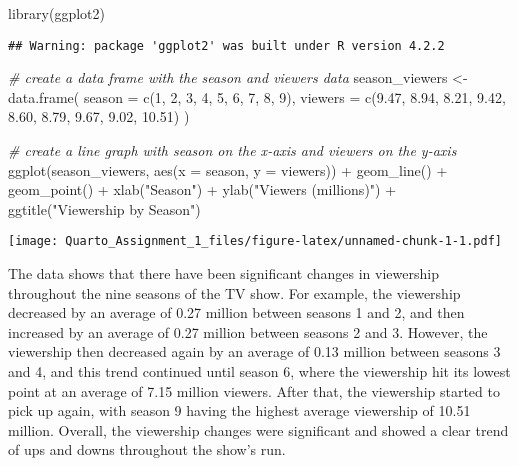 \documentclass[
]{article}
\newenvironment{Shaded}{\begin{snugshade}}{\end{snugshade}}
\newcommand{\AttributeTok}[1]{\textcolor[rgb]{0.77,0.63,0.00}{#1}}
\newcommand{\CommentTok}[1]{\textcolor[rgb]{0.56,0.35,0.01}{\textit{#1}}}
\newcommand{\DecValTok}[1]{\textcolor[rgb]{0.00,0.00,0.81}{#1}}
\newcommand{\FloatTok}[1]{\textcolor[rgb]{0.00,0.00,0.81}{#1}}
\newcommand{\FunctionTok}[1]{\textcolor[rgb]{0.00,0.00,0.00}{#1}}
\newcommand{\NormalTok}[1]{#1}
\newcommand{\OtherTok}[1]{\textcolor[rgb]{0.56,0.35,0.01}{#1}}
\newcommand{\SpecialCharTok}[1]{\textcolor[rgb]{0.00,0.00,0.00}{#1}}
\newcommand{\StringTok}[1]{\textcolor[rgb]{0.31,0.60,0.02}{#1}}
\begin{document}
\begin{Shaded}
\begin{Highlighting}[]
\FunctionTok{library}\NormalTok{(ggplot2)}
\end{Highlighting}
\end{Shaded}

\begin{verbatim}
## Warning: package 'ggplot2' was built under R version 4.2.2
\end{verbatim}

\begin{Shaded}
\begin{Highlighting}[]
\CommentTok{\# create a data frame with the season and viewers data}
\NormalTok{season\_viewers }\OtherTok{\textless{}{-}} \FunctionTok{data.frame}\NormalTok{(}
  \AttributeTok{season =} \FunctionTok{c}\NormalTok{(}\DecValTok{1}\NormalTok{, }\DecValTok{2}\NormalTok{, }\DecValTok{3}\NormalTok{, }\DecValTok{4}\NormalTok{, }\DecValTok{5}\NormalTok{, }\DecValTok{6}\NormalTok{, }\DecValTok{7}\NormalTok{, }\DecValTok{8}\NormalTok{, }\DecValTok{9}\NormalTok{),}
  \AttributeTok{viewers =} \FunctionTok{c}\NormalTok{(}\FloatTok{9.47}\NormalTok{, }\FloatTok{8.94}\NormalTok{, }\FloatTok{8.21}\NormalTok{, }\FloatTok{9.42}\NormalTok{, }\FloatTok{8.60}\NormalTok{, }\FloatTok{8.79}\NormalTok{, }\FloatTok{9.67}\NormalTok{, }\FloatTok{9.02}\NormalTok{, }\FloatTok{10.51}\NormalTok{)}
\NormalTok{)}

\CommentTok{\# create a line graph with season on the x{-}axis and viewers on the y{-}axis}
\FunctionTok{ggplot}\NormalTok{(season\_viewers, }\FunctionTok{aes}\NormalTok{(}\AttributeTok{x =}\NormalTok{ season, }\AttributeTok{y =}\NormalTok{ viewers)) }\SpecialCharTok{+}
  \FunctionTok{geom\_line}\NormalTok{() }\SpecialCharTok{+}
  \FunctionTok{geom\_point}\NormalTok{() }\SpecialCharTok{+}
  \FunctionTok{xlab}\NormalTok{(}\StringTok{"Season"}\NormalTok{) }\SpecialCharTok{+}
  \FunctionTok{ylab}\NormalTok{(}\StringTok{"Viewers (millions)"}\NormalTok{) }\SpecialCharTok{+}
  \FunctionTok{ggtitle}\NormalTok{(}\StringTok{"Viewership by Season"}\NormalTok{)}
\end{Highlighting}
\end{Shaded}

\texttt{[image: Quarto\_Assignment\_1\_files/figure-latex/unnamed-chunk-1-1.pdf]}

The data shows that there have been significant changes in viewership
throughout the nine seasons of the TV show. For example, the viewership
decreased by an average of 0.27 million between seasons 1 and 2, and
then increased by an average of 0.27 million between seasons 2 and 3.
However, the viewership then decreased again by an average of 0.13
million between seasons 3 and 4, and this trend continued until season
6, where the viewership hit its lowest point at an average of 7.15
million viewers. After that, the viewership started to pick up again,
with season 9 having the highest average viewership of 10.51 million.
Overall, the viewership changes were significant and showed a clear
trend of ups and downs throughout the show's run.
\end{document}
